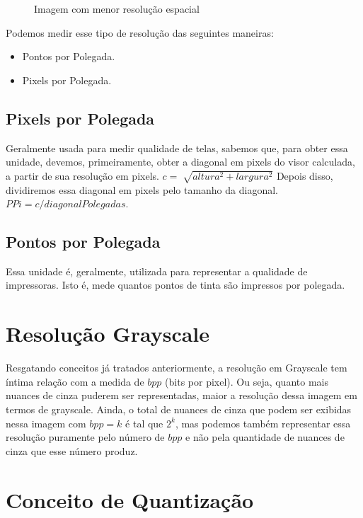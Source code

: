 \documentclass[a4paper, 12pt]{article}
\begin{document}
\begin{figure}[!htb]
	  \caption{Imagem com menor resolução espacial}
	\endminipage
\end{figure}
Podemos medir esse tipo de resolução das seguintes maneiras:
\begin{itemize}
	\item Pontos por Polegada.
 	\item Pixels por Polegada.
\end{itemize}

\subsection{Pixels por Polegada}
Geralmente usada para medir qualidade de telas, sabemos que, para obter essa unidade, devemos, primeiramente, 
obter a diagonal em pixels do visor calculada, a partir de sua resolução em pixels. $c = \sqrt[]{altura^2 + largura^2}$
Depois disso, dividiremos essa diagonal em pixels pelo tamanho da diagonal. $PPi = c/diagonalPolegadas$.

\subsection{Pontos por Polegada}
Essa unidade é, geralmente, utilizada para representar a qualidade de impressoras. Isto é, mede quantos pontos de tinta são impressos 
por polegada.

\section{Resolução Grayscale}
Resgatando conceitos já tratados anteriormente, a resolução em Grayscale tem íntima relação com a medida de $bpp$ (bits por pixel). Ou seja, 
quanto mais nuances de cinza puderem ser representadas, maior a resolução dessa imagem em termos de grayscale. Ainda, o total de nuances de cinza 
que podem ser exibidas nessa imagem com $bpp = k$ é tal que $2^k$, mas podemos também representar essa resolução puramente pelo número de 
$bpp$ e não pela quantidade de nuances de cinza que esse número produz.

\section{Conceito de Quantização}
\end{document}
